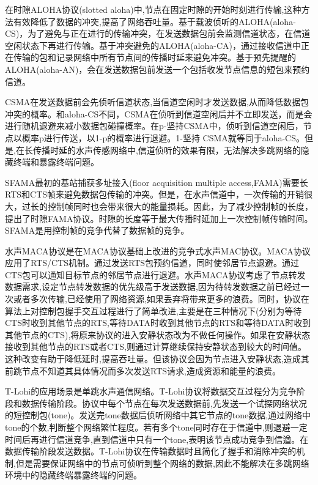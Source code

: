 在时隙ALOHA协议(slotted aloha)中,节点在固定时隙的开始时刻进行传输,这种方法有效降低了数据的冲突,提高了网络吞吐量。基于载波侦听的ALOHA(aloha-CS)，为了避免与正在进行的传输冲突，在发送数据包前会监测信道状态，在信道空闲状态下再进行传输。基于冲突避免的ALOHA(aloha-CA)，通过接收信道中正在传输的包和记录网络中所有节点间的传播时延来避免冲突。基于预先提醒的ALOHA(aloha-AN)，会在发送数据包前发送一个包括收发节点信息的短包来预约信道。

CSMA在发送数据前会先侦听信道状态,当信道空闲时才发送数据,从而降低数据包冲突的概率。和aloha-CS不同，CSMA在侦听到信道空闲后并不立即发送，而是会进行随机退避来减小数据包碰撞概率。在p-坚持CSMA中，侦听到信道空闲后，节点以概率p进行传送，以1-p的概率进行退避。1-坚持 CSMA就等同于aloha-CS。但是,在长传播时延的水声传感网络中,信道侦听的效果有限，无法解决多跳网络的隐藏终端和暴露终端问题。

SFAMA最初的基站捕获多址接入(floor acquisition multiple access,FAMA)需要长RTS和CTS帧来避免数据包传输的冲突。但是，在水声信道中，一次传输的开销很大，过长的控制帧同时也会带来很大的能量损耗。因此，为了减少控制帧的长度，提出了时隙FAMA协议。时隙的长度等于最大传播时延加上一次控制帧传输时间。SFAMA是用控制帧的竞争代替了数据帧的竞争。

水声MACA协议是在MACA协议基础上改进的竞争式水声MAC协议。MACA协议应用了RTS/CTS机制。通过发送RTS包预约信道，同时使邻居节点退避。通过CTS包可以通知目标节点的邻居节点进行退避。水声MACA协议考虑了节点转发数据需求,设定节点转发数据的优先级高于发送数据,因为待转发数据之前已经过一次或者多次传输,已经使用了网络资源,如果丢弃将带来更多的浪费。同时，协议在算法上对控制包握手交互过程进行了简单改进,主要是在三种情况下(分别为等待CTS时收到其他节点的RTS,等待DATA时收到其他节点的RTS和等待DATA时收到其他节点的CTS),将原来协议的进入安静状态改为不做任何操作。如果在安静状态接收到其他节点的RTS或者CTS,则通过计算继续保持安静状态到较大的时间值。这种改变有助于降低延时,提高吞吐量。但该协议会因为节点进入安静状态,造成其前跳节点不知道其具体情况而多次发送RTS请求,造成资源和能量的浪费。

T-Lohi的应用场景是单跳水声通信网络。T-Lohi协议将数据交互过程分为竞争阶段和数据传输阶段。协议中每个节点在每次发送数据前,先发送一个试探网络状况的短控制包(tone)。发送完tone数据后侦听网络中其它节点的tone数据,通过网络中tone的个数,判断整个网络繁忙程度。若有多个tone同时存在于信道中,则退避一定时间后再进行信道竞争,直到信道中只有一个tone,表明该节点成功竞争到信遒。在数据传输阶段发送数据。T-Lohi协议在传输数据时且简化了握手和消除冲突的机制,但是需要保证网络中的节点可侦听到整个网络的数据,因此不能解决在多跳网络环境中的隐藏终端暴露终端的问题。

